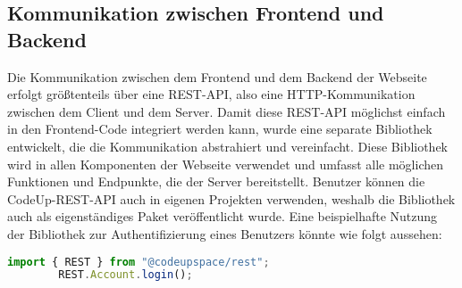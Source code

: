 \documentclass[main.tex]{subfiles}
\begin{document}
    \subsection{Kommunikation zwischen Frontend und Backend}
    Die Kommunikation zwischen dem Frontend und dem Backend der Webseite erfolgt größtenteils über eine REST-API, also eine HTTP-Kommunikation zwischen dem Client und dem Server.
    Damit diese REST-API möglichst einfach in den Frontend-Code integriert werden kann, wurde eine separate Bibliothek entwickelt, die die Kommunikation abstrahiert und vereinfacht.
    Diese Bibliothek wird in allen Komponenten der Webseite verwendet und umfasst alle möglichen Funktionen und Endpunkte, die der Server bereitstellt.
    Benutzer können die CodeUp-REST-API auch in eigenen Projekten verwenden, weshalb die Bibliothek auch als eigenständiges Paket veröffentlicht wurde.
    Eine beispielhafte Nutzung der Bibliothek zur Authentifizierung eines Benutzers könnte wie folgt aussehen:
    \begin{lstlisting}[language=javascript]
        import { REST } from "@codeupspace/rest";
        REST.Account.login();
    \end{lstlisting}
\end{document}
